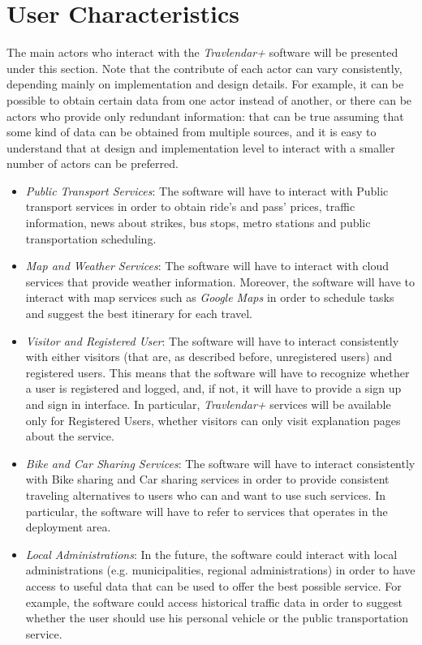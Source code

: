 \section{User Characteristics}
The main actors who interact with the \emph{Travlendar+} software will be presented under this section. Note that the contribute of each actor can vary consistently, depending mainly on implementation and design details. For example, it can be possible to obtain certain data from one actor instead of another, or there can be actors who provide only redundant information: that can be true assuming that some kind of data can be obtained from multiple sources, and it is easy to understand that at design and implementation level to interact with a smaller number of actors can be preferred.
\begin{itemize}

	\item \emph{Public Transport Services}: The software will have to interact with Public transport services in order to obtain ride's and pass' prices, traffic information, news about strikes, bus stops, metro stations and public transportation scheduling.
    
    \item \emph{Map and Weather Services}: The software will have to interact with cloud services that provide weather information. Moreover, the software will have to interact with map services such as \emph{Google Maps} in order to schedule tasks and suggest the best itinerary for each travel.
    
    \item \emph{Visitor and Registered User}: The software will have to interact consistently with either visitors (that are, as described before, unregistered users) and registered users. This means that the software will have to recognize whether a user is registered and logged, and, if not, it will have to provide a sign up and sign in interface. In particular, \emph{Travlendar+} services will be available only for Registered Users, whether visitors can only visit explanation pages about the service.
    
    \item \emph{Bike and Car Sharing Services}: The software will have to interact consistently with Bike sharing and Car sharing services in order to provide consistent traveling alternatives to users who can and want to use such services. In particular, the software will have to refer to services that operates in the deployment area. 
    
    \item \emph{Local Administrations}: In the future, the software could interact with local administrations (e.g. municipalities, regional administrations) in order to have access to useful data that can be used to offer the best possible service. For example, the software could access historical traffic data in order to suggest whether the user should use his personal vehicle or the public transportation service.  

\end{itemize}